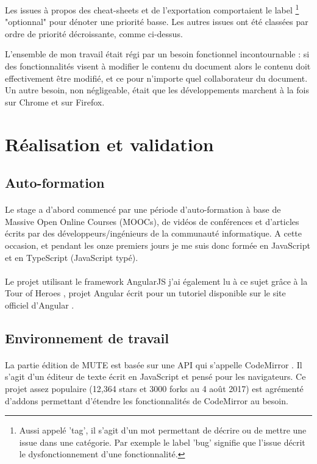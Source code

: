 \documentclass[12pt]{article}
\begin{document}
Les issues à propos des cheat-sheets et de l'exportation comportaient le label \footnote{Aussi appelé 'tag', il s'agit d'un mot permettant de décrire ou de mettre une issue dans une catégorie. Par exemple le label 'bug' signifie que l'issue décrit le dysfonctionnement d'une fonctionnalité.} "optionnal" pour dénoter une priorité basse. Les autres issues ont été classées par ordre de priorité décroissante, comme ci-dessus.

L'ensemble de mon travail était régi par un besoin fonctionnel incontournable : si des fonctionnalités visent à modifier le contenu du document alors le contenu doit effectivement être modifié, et ce pour n'importe quel collaborateur du document. Un autre besoin, non négligeable, était que les développements marchent à la fois sur Chrome et sur Firefox.

\newpage
\section{Réalisation et validation}
\subsection{Auto-formation}
\paragraph{}
Le stage a d'abord commencé par une période d'auto-formation à base de Massive Open Online Courses (MOOCs), de vidéos de conférences et d'articles écrits par des développeurs/ingénieurs de la communauté informatique. A cette occasion, et pendant les onze premiers jours je me suis donc formée en JavaScript et en TypeScript (JavaScript typé).
\paragraph{}
Le projet utilisant le framework AngularJS j'ai également lu à ce sujet grâce à la Tour of Heroes \cite{tour}, projet Angular écrit pour un tutoriel disponible sur le site officiel d'Angular \cite{angular}.

\subsection{Environnement de travail}
\paragraph{}
La partie édition de MUTE est basée sur une API qui s'appelle CodeMirror \cite{codemirror}. Il s'agit d'un éditeur de texte écrit en JavaScript et pensé pour les navigateurs. Ce projet assez populaire (12,364 stars et 3000 forks au 4 août 2017) est agrémenté d'addons permettant d'étendre les fonctionnalités de CodeMirror au besoin.
\end{document}
